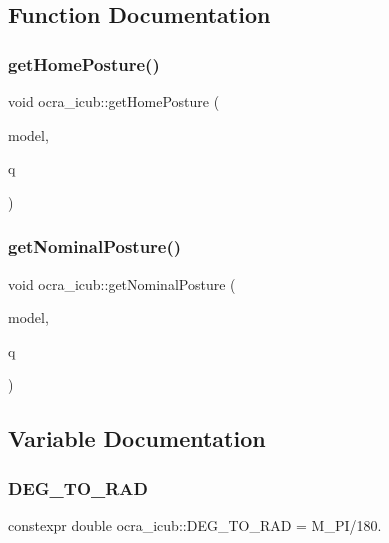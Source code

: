 \subsection{Function Documentation}
\hypertarget{namespaceocra__icub_a91c3caf94014ea9988e56dd2572768ce}{}\label{namespaceocra__icub_a91c3caf94014ea9988e56dd2572768ce} 
\subsubsection{\texorpdfstring{get\+Home\+Posture()}{getHomePosture()}}
{\footnotesize\ttfamily void ocra\+\_\+icub\+::get\+Home\+Posture (\begin{DoxyParamCaption}\item[{const ocra\+::\+Model \&}]{model,  }\item[{Eigen\+::\+Vector\+Xd \&}]{q }\end{DoxyParamCaption})}

\hypertarget{namespaceocra__icub_a07ffe33877389b6b111944e8a666e221}{}\label{namespaceocra__icub_a07ffe33877389b6b111944e8a666e221} 
\subsubsection{\texorpdfstring{get\+Nominal\+Posture()}{getNominalPosture()}}
{\footnotesize\ttfamily void ocra\+\_\+icub\+::get\+Nominal\+Posture (\begin{DoxyParamCaption}\item[{const ocra\+::\+Model \&}]{model,  }\item[{Eigen\+::\+Vector\+Xd \&}]{q }\end{DoxyParamCaption})}



\subsection{Variable Documentation}
\hypertarget{namespaceocra__icub_ab06477ded34ed5514b911a3511b22e3d}{}\label{namespaceocra__icub_ab06477ded34ed5514b911a3511b22e3d} 
\subsubsection{\texorpdfstring{D\+E\+G\+\_\+\+T\+O\+\_\+\+R\+AD}{DEG\_TO\_RAD}}
{\footnotesize\ttfamily constexpr double ocra\+\_\+icub\+::\+D\+E\+G\+\_\+\+T\+O\+\_\+\+R\+AD = M\+\_\+\+PI/180.\hspace{0.3cm}{\ttfamily [static]}}

